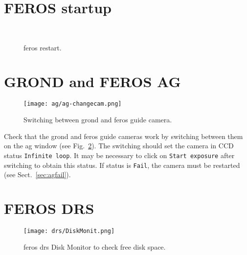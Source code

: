 \documentclass[11pt,fleqn]{book} %
\begin{document}
\newpage
\section{FEROS startup}

\begin{figure}[b!]
\hspace{0.12\linewidth}
\\
\hspace{0.08\linewidth}%
\hspace{0.05\linewidth}
\caption{\gls{feros} restart.}
\label{fig:feros-restart}
\end{figure}

\newpage
\section{GROND and FEROS AG}
\begin{figure}[ht!]
\centering
\texttt{[image: ag/ag-changecam.png]}
\caption[Switching between GROND and FEROS guide cameras]{Switching between \gls{grond} and \gls{feros} guide camera.}
\label{fig:agswitch}
\end{figure}
Check that the \gls{grond} and \gls{feros} guide cameras work by
switching between them on the \gls{ag} window (see Fig.~\ref{fig:agswitch}).
The switching should set the camera in CCD status \texttt{Infinite loop}.  It 
may be necessary to click on \texttt{Start exposure} after switching to
obtain this status.  If status is \texttt{Fail}, the camera must be restarted (see 
Sect.~\ref{sec:agfail}).

\section{FEROS DRS}
\begin{figure}[ht!]
\centering
\texttt{[image: drs/DiskMonit.png]}
\caption{\gls{feros} \gls{drs} Disk Monitor to check free disk space.}
\label{fig:diskmonit}
\end{figure}
\end{document}
